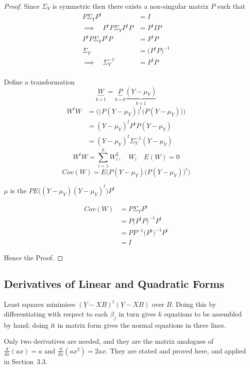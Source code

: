 \documentclass[11pt,a4paper]{article}
\theoremstyle{definition}
\begin{document}
\begin{proof}
Since $\Sigma_Y$ is symmetric then there exists a non-singular matrix $P$ such that 
\begin{align*}
P\Sigma_YP^t & = I\\
\implies \quad  P^tP\Sigma_YP^tP & = P^tIP\\
P^tP\Sigma_YP^tP & = P^tP\\
\Sigma_Y & = \big(P^tP\big)^{-1}\\
\implies \quad  \Sigma^{-1}_Y & = P^tP\\
\end{align*}

Define a transformation $$\underbrace{W}_{k\times 1}=\underbrace{P}_{k\times k} \underbrace{(Y-\mu_Y)}_{k\times 1}$$
\begin{align*}
W^tW & = \Big(\big(P(Y-\mu_Y)\big)^t\big(P(Y-\mu_Y)\big)\Big)\\
     & = (Y-\mu_Y)^tP^tP(Y-\mu_Y)\\
     & = (Y-\mu_Y)^t\Sigma^{-1}_Y(Y-\mu_Y)
\end{align*}
$$W^tW=\sum^k_{i=1}W_i^2,\quad  W_i\quad  E(W)=0$$
$$Cov(W)=E\Big(P(Y-\mu_Y)\big(P(Y-\mu_Y)\big)^t\Big)$$

$\mu$ is the $PE\Big((Y-\mu_Y)(Y-\mu_Y)^t\Big)P^t$

\begin{align*}
Cov(W) & = P\Sigma_YP^t\\
       & = P\big(P^tP\big)^{-1}P^t\\
       & = PP^{-1}\big(P^t\big)^{-1}P^t\\
       & = I
\end{align*}

Hence the Proof.
\end{proof}


\subsection{Derivatives of Linear and Quadratic Forms}
Least squares minimises $\left(\underline{Y}-XB\right)^t
\left(\underline{Y}-XB\right)$ over $B$. Doing this by differentiating with
respect to each $\beta_j$ in turn gives $k$ equations to be assembled by hand;
doing it in matrix form gives the normal equations in three lines.

Only two derivatives are needed, and they are the matrix analogues of
$\frac{d}{dx}(ax)=a$ and $\frac{d}{dx}(ax^2)=2ax$. They are stated and proved
here, and applied in Section~3.3.
\end{document}
